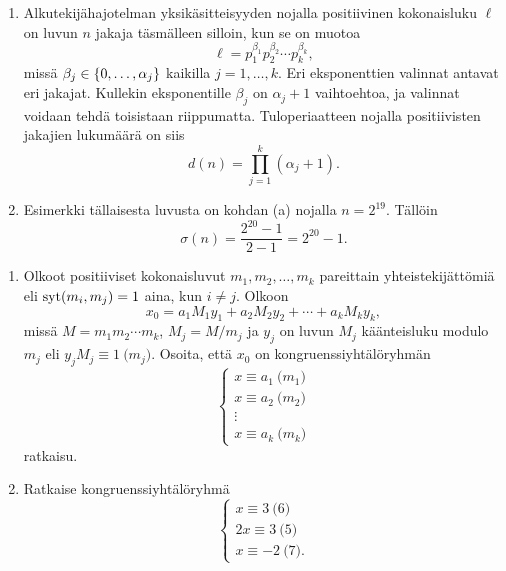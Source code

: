 \documentclass[11pt,a4paper]{amsart}
\begin{document}
\begin{solution}
  \leavevmode\par
  \begin{enumerate}[label=(\alph*), nosep]
    \item Alkutekijähajotelman yksikäsitteisyyden nojalla positiivinen
      kokonaisluku \(\ell\) on luvun \(n\) jakaja täsmälleen silloin, kun
      se on muotoa
      \[
        \ell = p_1^{\beta_1}p_2^{\beta_2}\cdots p_k^{\beta_k},
      \]
      missä \(\beta_j \in \left\lbrace0,\dots,\alpha_j\right\rbrace\) kaikilla
      \(j=1,\dots,k\). Eri eksponenttien valinnat antavat eri jakajat.
      Kullekin eksponentille \(\beta_j\) on \(\alpha_j+1\) vaihtoehtoa,
      ja valinnat voidaan tehdä toisistaan riippumatta. Tuloperiaatteen
      nojalla positiivisten jakajien lukumäärä on siis
      \[
        d(n) = \prod_{j=1}^{k}(\alpha_j + 1).
      \]
    \item Esimerkki tällaisesta luvusta on kohdan (a) nojalla \(n = 2^{19}\).
      Tällöin
      \[
        \sigma(n) = \frac{2^{20} - 1}{2 - 1} = 2^{20} - 1.
      \]
  \end{enumerate}
\end{solution}

\begin{exercise}
  \leavevmode\par
  \begin{enumerate}[label=(\alph*), nosep]
    \item Olkoot positiiviset kokonaisluvut \(m_1, m_2, \ldots, m_k\)
      pareittain yhteistekijättömiä eli \(\operatorname{syt}(m_i, m_j) = 1\) aina, kun
      \(i \ne j\). Olkoon
      \[
        x_0 = a_1M_1y_1 + a_2M_2y_2 + \cdots + a_kM_ky_k,
      \]
      missä \(M = m_1m_2\cdots m_k\), \(M_j = M/m_j\) ja \(y_j\)
      on luvun \(M_j\) käänteisluku modulo \(m_j\) eli
      \(y_jM_j \equiv 1 \pod{m_j}\). Osoita, että \(x_0\) on
      kongruenssiyhtälöryhmän
      \[
        \begin{cases}
          x \equiv a_1 \pod{m_1} \\
          x \equiv a_2 \pod{m_2} \\
          \vdots \\
          x \equiv a_k \pod{m_k}
        \end{cases}
      \]
      ratkaisu.
    \item Ratkaise kongruenssiyhtälöryhmä
      \[
        \begin{cases}
          x \equiv 3 \pod{6} \\
          2x \equiv 3 \pod{5} \\
          x \equiv -2 \pod{7}.
        \end{cases}
      \]
  \end{enumerate}
\end{exercise}
\end{document}

